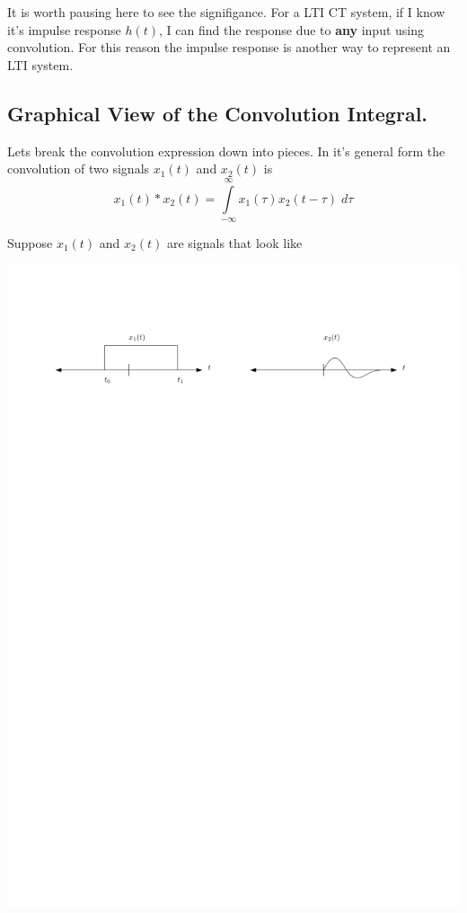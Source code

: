 It is worth pausing here to see the signifigance. For a LTI CT system, if I know it's impulse response $h(t)$, I can find the response due to \textbf{any} input using convolution. For this reason the impulse response is another way to represent an LTI system.

\subsection{Graphical View of the Convolution Integral.}

Lets break the convolution expression down into pieces. In it's general form the convolution of two signals $x_1(t)$ and $x_2(t)$ is
\[
x_1(t) * x_2(t) = \int\limits_{-\infty}^{\infty} x_1(\tau)x_2(t-\tau) \; d\tau
\]

Suppose $x_1(t)$ and $x_2(t)$ are signals that look like
\begin{center}
  \includegraphics[scale=1]{graphics/convolution-explain1.pdf}
\end{center}

